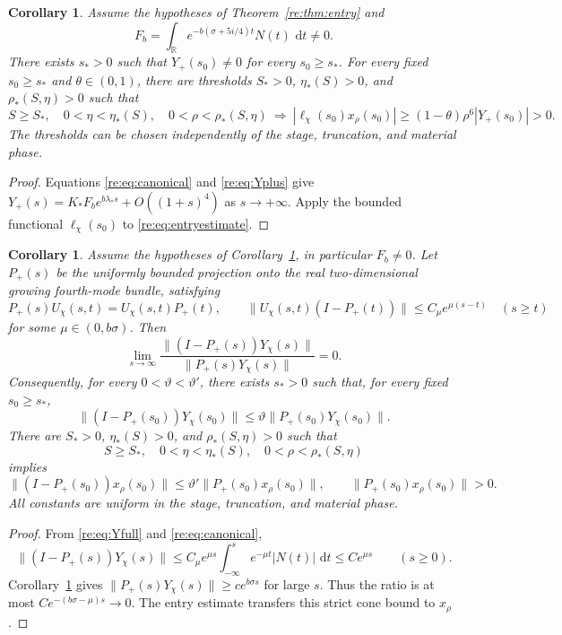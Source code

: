 \documentclass[11pt]{amsart}
\newtheorem{corollary}[theorem]{Corollary}
\theoremstyle{remark}
\numberwithin{equation}{section}
\newcommand{\R}{\mathbb R}
\newcommand{\dd}{\,\mathrm d}
\begin{document}
\begin{corollary}
\label{re:cor:seed}
Assume the hypotheses of Theorem~\ref{re:thm:entry} and
\[
 F_b=\int_\R e^{-b(\sigma+5i/4)t}N(t)\,\dd t\ne0.
\]
There exists $s_*>0$ such that $Y_+(s_0)\ne0$ for every
$s_0\ge s_*$. For every fixed $s_0\ge s_*$ and
$\theta\in(0,1)$, there are thresholds
$S_*>0$, $\eta_*(S)>0$, and $\rho_*(S,\eta)>0$ such that
\[
 S\ge S_*,\quad 0<\eta<\eta_*(S),\quad
 0<\rho<\rho_*(S,\eta)
 \ \Longrightarrow\
 |\ell_\chi(s_0)x_\rho(s_0)|
       \ge(1-\theta)\rho^6|Y_+(s_0)|>0.
\]
The thresholds can be chosen independently of the stage,
truncation, and material phase.
\end{corollary}
\begin{proof}
Equations \eqref{re:eq:canonical} and \eqref{re:eq:Yplus} give
$Y_+(s)=K_*F_be^{b\lambda_*s}+O((1+s)^4)$ as $s\to+\infty$.
Apply the bounded functional $\ell_\chi(s_0)$ to
\eqref{re:eq:entryestimate}.
\end{proof}

\begin{corollary}
\label{re:cor:cone}
Assume the hypotheses of Corollary~\ref{re:cor:seed}, in particular
$F_b\ne0$. Let $P_+(s)$ be the uniformly bounded projection onto
the real two-dimensional growing fourth-mode bundle, satisfying
\[
 P_+(s)U_\chi(s,t)=U_\chi(s,t)P_+(t),\qquad
 \|U_\chi(s,t)(I-P_+(t))\|\le C_\mu e^{\mu(s-t)}
 \quad(s\ge t)
\]
for some $\mu\in(0,b\sigma)$. Then
\[
 \lim_{s\to\infty}
 \frac{\|(I-P_+(s))Y_\chi(s)\|}{\|P_+(s)Y_\chi(s)\|}=0.
\]
Consequently, for every $0<\vartheta<\vartheta'$, there exists
$s_*>0$ such that, for every fixed $s_0\ge s_*$,
\[
 \|(I-P_+(s_0))Y_\chi(s_0)\|
       \le\vartheta\|P_+(s_0)Y_\chi(s_0)\|.
\]
There are $S_*>0$, $\eta_*(S)>0$, and $\rho_*(S,\eta)>0$ such that
\[
 S\ge S_*,\quad0<\eta<\eta_*(S),\quad0<\rho<\rho_*(S,\eta)
\]
implies
\[
 \|(I-P_+(s_0))x_\rho(s_0)\|
       \le\vartheta'\|P_+(s_0)x_\rho(s_0)\|,
 \qquad \|P_+(s_0)x_\rho(s_0)\|>0.
\]
All constants are uniform in the stage, truncation, and material phase.
\end{corollary}
\begin{proof}
From \eqref{re:eq:Yfull} and \eqref{re:eq:canonical},
\[
 \|(I-P_+(s))Y_\chi(s)\|
 \le C_\mu e^{\mu s}\int_{-\infty}^s e^{-\mu t}|N(t)|\,\dd t
 \le Ce^{\mu s}\qquad(s\ge0).
\]
Corollary~\ref{re:cor:seed} gives
$\|P_+(s)Y_\chi(s)\|\ge ce^{b\sigma s}$ for large $s$.
Thus the ratio is at most $Ce^{-(b\sigma-\mu)s}\to0$.
The entry estimate transfers this strict cone bound to $x_\rho$.
\end{proof}
\end{document}
